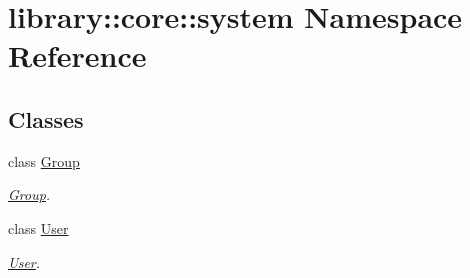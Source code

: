 \hypertarget{namespacelibrary_1_1core_1_1system}{}\section{library\+::core\+::system Namespace Reference}
\label{namespacelibrary_1_1core_1_1system}
\subsection*{Classes}
\begin{DoxyCompactItemize}
\item 
class \mbox{\hyperlink{classlibrary_1_1core_1_1system_1_1_group}{Group}}
\begin{DoxyCompactList}\small\item\em \mbox{\hyperlink{classlibrary_1_1core_1_1system_1_1_group}{Group}}. \end{DoxyCompactList}\item 
class \mbox{\hyperlink{classlibrary_1_1core_1_1system_1_1_user}{User}}
\begin{DoxyCompactList}\small\item\em \mbox{\hyperlink{classlibrary_1_1core_1_1system_1_1_user}{User}}. \end{DoxyCompactList}\end{DoxyCompactItemize}
